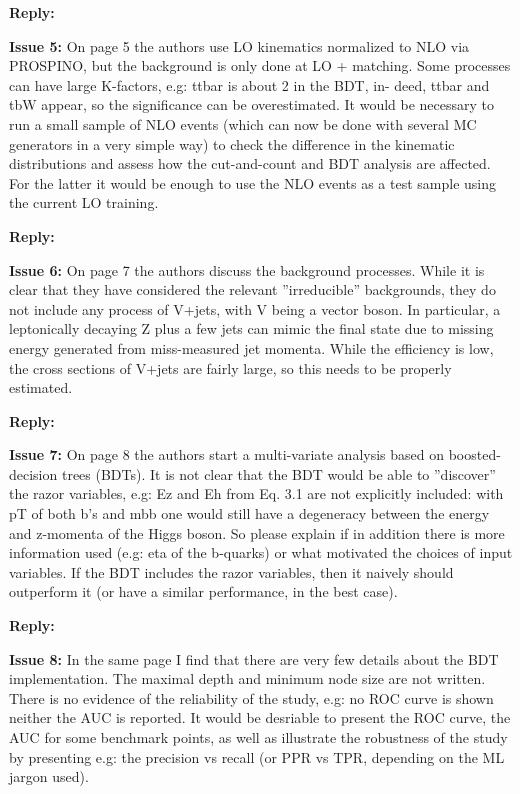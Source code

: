 \documentclass[12pt]{article}
\newcommand{\issue}[1]{\bigskip\noindent\textbf{\color{Maroon}Issue #1: }}
\newcommand{\reply}{\medskip\noindent\textbf{\color{RoyalBlue}Reply:}}
\begin{document}
\reply{} 

\issue{5} On page 5 the authors use LO kinematics normalized
to NLO via PROSPINO, but the background is only done at LO + matching. Some
processes can have large K-factors, e.g: ttbar is about 2 in the BDT, in- deed,
ttbar and tbW appear, so the significance can be overestimated. It would be
necessary to run a small sample of NLO events (which can now be done with
several MC generators in a very simple way) to check the difference in the
kinematic distributions and assess how the cut-and-count and BDT analysis are
affected. For the latter it would be enough to use the NLO events as a test
sample using the current LO training.

\reply{} 

\issue{6} On page 7 the authors discuss the background
processes. While it is clear that they have considered the relevant
”irreducible” backgrounds, they do not include any process of V+jets, with V
being a vector boson. In particular, a leptonically decaying Z plus a few jets
can mimic the final state due to missing energy generated from miss-measured
jet momenta. While the efficiency is low, the cross sections of V+jets are
fairly large, so this needs to be properly estimated.

\reply{} 

\issue{7} On page 8 the authors start a multi-variate analysis
based on boosted- decision trees (BDTs). It is not clear that the BDT would be
able to ”discover” the razor variables, e.g: Ez and Eh from Eq. 3.1 are not
explicitly included: with pT of both b’s and mbb one would still have a
degeneracy between the energy and z-momenta of the Higgs boson. So please
explain if in addition there is more information used (e.g: eta of the
b-quarks) or what motivated the choices of input variables. If the BDT includes
the razor variables, then it naively should outperform it (or have a similar
performance, in the best case).

\reply{} 

\issue{8} In the same page I find that there are very few details
about the BDT implementation. The maximal depth and minimum node size are not
written. There is no evidence of the reliability of the study, e.g: no ROC
curve is shown neither the AUC is reported. It would be desriable to present
the ROC curve, the AUC for some benchmark points, as well as illustrate the
robustness of the study by presenting e.g: the precision vs recall (or PPR vs
TPR, depending on the ML jargon used).
\end{document}
